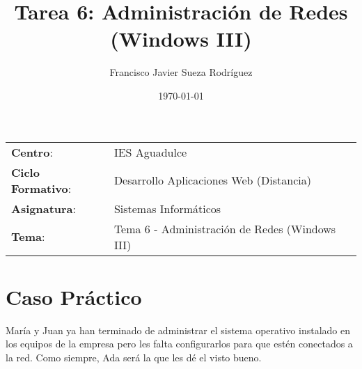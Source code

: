 


\title{
\vspace{10ex}
\normalfont \normalsize
\Huge \textbf{Tarea 6: Administración de Redes (Windows III)}
}
\author{Francisco Javier Sueza Rodríguez}
\date{\normalsize\today}



\maketitle

\thispagestyle{empty}

\vspace{68ex}

\begin{center}
    \begin{tabular}{l l}
        \textbf{Centro}: & IES Aguadulce \\
        \textbf{Ciclo Formativo}: & Desarrollo Aplicaciones Web (Distancia)\\
        \textbf{Asignatura}: & Sistemas Informáticos\\
        \textbf{Tema}: & Tema 6 -  Administración de Redes (Windows III)\\
    \end{tabular}
\end{center}

\newpage

\tableofcontents

\newpage

\listoffigures

\newpage

\section{Caso Práctico}
María y Juan ya han terminado de administrar el sistema operativo instalado en los equipos de la empresa pero les falta configurarlos para que estén conectados a la red. Como siempre, Ada será la que les dé el visto bueno.

